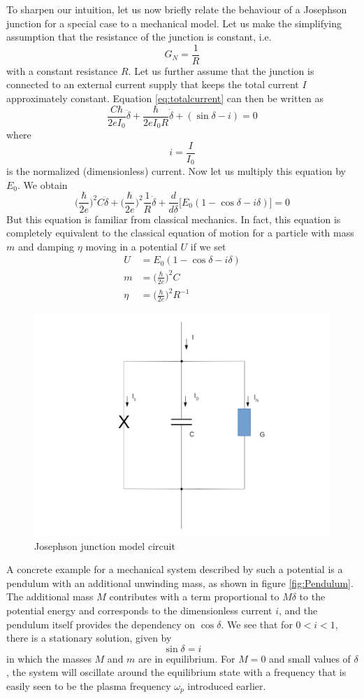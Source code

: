 \documentclass[a4paper, draft]{article}
\theoremstyle{own}
\theoremstyle{remark}
\begin{document}
To sharpen our intuition, let us now briefly relate the behaviour of a Josephson junction for a special case to a mechanical model. Let us make the simplifying assumption that the resistance of the junction is constant, i.e. 
$$
G_N = \frac{1}{R}
$$
with a constant resistance $R$. Let us further assume that the junction is connected to an external current supply that keeps the total current $I$ approximately constant. Equation \eqref{eq:totalcurrent} can then be written as
$$
\frac{C \hbar}{2eI_0} \ddot{\delta} + \frac{\hbar}{2eI_0R} \dot{\delta}  + (\sin \delta - i) = 0
$$
where
$$
i = \frac{I}{I_0}
$$
is the normalized (dimensionless) current. Now let us multiply this equation by $E_0$. We obtain
$$
\big( \frac{\hbar}{2e} \big)^2  C \ddot{\delta}
+
\big( \frac{\hbar}{2e} \big)^2 \frac{1}{R} \dot{\delta} 
+ \frac{d}{d \delta} \big[ E_0 (1 - \cos \delta - i \delta) \big] = 0
$$
But this equation is familiar from classical mechanics. In fact, this equation is completely equivalent to the classical equation of motion for a particle with mass $m$ and damping $\eta$ moving in a potential $U$ if we set
\begin{align*}
U &= E_0 (1 - \cos \delta - i \delta) \\
m&= \big( \frac{\hbar}{2e} \big)^2  C \\
\eta &= \big( \frac{\hbar}{2e} \big)^2 R^{-1}
\end{align*}

\begin{figure}
\centering
\includegraphics[width=0.7\linewidth]{images/JosephsonJunction}
\caption[Josephen junction]{Josephson junction model circuit}
\label{fig:JosephsonJunction}
\end{figure}

A concrete example for a mechanical system described by such a potential is a pendulum with an additional unwinding mass, as shown in figure \ref{fig:Pendulum}. The additional mass $M$ contributes with a term proportional to $M \delta$ to the potential energy and corresponds to the dimensionless current $i$, and the pendulum itself provides the dependency on $\cos \delta$. We see that for $0 < i < 1$, there is a stationary solution, given by
$$
\sin \delta = i
$$
in which the masses $M$ and $m$ are in equilibrium. For $M = 0$ and small values of $\delta$, the system will oscillate around the equilibrium state with a frequency that is easily seen to be the plasma frequency $\omega_p$ introduced earlier.
\end{document}
